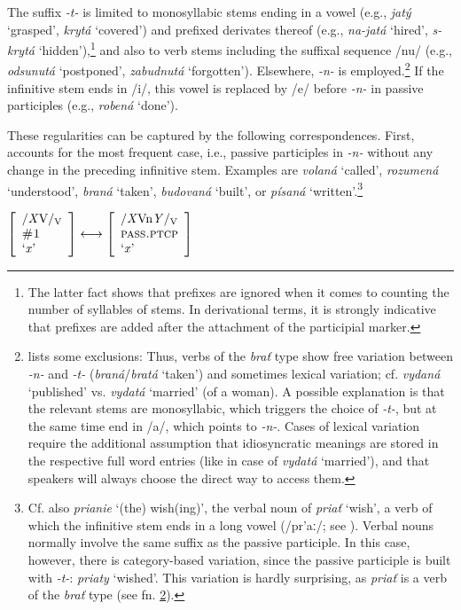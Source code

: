 \documentclass[output=paper,colorlinks,citecolor=brown]{langscibook}
\begin{document}
The suffix \textit{-t-} is limited to monosyllabic stems ending in a vowel (e.g., \textit{jatý} `grasped', \textit{krytá} `covered') and prefixed derivates thereof (e.g., \textit{na-jatá} `hired', \textit{s-krytá} `hidden'),\footnote{The latter fact shows that prefixes are ignored when it comes to counting the number of syllables of stems. In derivational terms, it is strongly indicative that prefixes are added after the attachment of the participial marker.} and also to verb stems including the suffixal sequence /nu/ (e.g., \textit{odsunutá} `postponed', \textit{zabudnutá} `forgotten'). Elsewhere, \textit{-n-} is employed.\footnote{\label{fn:Pass}\citet[560]{Short1993} lists some exclusions: Thus, verbs of the \textit{brať} type show free variation between \textit{-n-} and \textit{-t-} (\textit{braná}/\textit{bratá} `taken') and sometimes lexical variation; cf. \textit{vydaná} `published' vs. \textit{vydatá} `married' (of a woman). A possible explanation is that the relevant stems are monosyllabic, which triggers the choice of \textit{-t-}, but at the same time end in /a/, which points to \textit{-n-}. Cases of lexical variation require the additional assumption that idiosyncratic meanings are stored in the respective full word entries (like in case of \textit{vydatá} `married'), and that speakers will always choose the direct way to access them.} If the infinitive stem ends in /i/, this vowel is replaced by /e/ before \textit{-n-} in passive participles (e.g., \textit{robená} `done'). 

These regularities can be captured by the following correspondences. First,  accounts for the most frequent case, i.e., passive participles in \textit{-n-} without any change in the preceding infinitive stem. Examples are \textit{volaná} `called', \textit{rozumená} `understood', \textit{braná} `taken', \textit{budovaná} `built', or \textit{písaná} `written'.\footnote{Cf. also \textit{prianie} `(the) wish(ing)', the verbal noun of \textit{priať} `wish', a verb of which the infinitive stem ends in a long vowel (/pr'aː/; see ). Verbal nouns normally involve the same suffix as the passive participle. In this case, however, there is category-based variation, since the passive participle is built with \textit{-t-}: \textit{priaty} `wished'. This variation is hardly surprising, as \textit{priať} is a verb of the \textit{brať} type (see fn. \ref{fn:Pass}).}

\ea\label{ex:rulePASS_n}
$\left[
\begin{array}{l}
    \text{/\textit{X}V/\textsubscript{V}} \\
    \textsc{\#1} \\
    \text{`\textit{x}'}
\end{array}
\right] 
\longleftrightarrow
\left[
\begin{array}{l}
    \text{/\textit{X}Vn\textit{Y}/\textsubscript{V}} \\
    \textsc{pass.ptcp} \\
    \text{`\textit{x}'}
\end{array}
\right] $
\z
    
\end{document}
